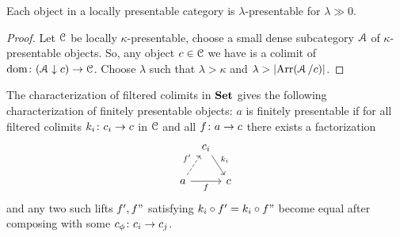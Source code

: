 \documentclass[a4paper,11pt,oneside,openany]{scrbook}
\begin{document}
\begin{prop}
   Each object in a locally presentable category is $ \lambda $-presentable
   for $ \lambda \gg 0 $.
\end{prop}
\begin{proof}
    Let $ \operatorname{\mathcal{C}} $ be locally $\kappa $-presentable, choose a small dense subcategory $\operatorname{\mathcal{A}} $ of $ \kappa $-presentable objects.
    So, any object $ c \in \operatorname{\mathcal{C}} $ we have is a colimit of $\operatorname{dom}\colon (\operatorname{\mathcal{A}}\downarrow c)\rightarrow\operatorname{\mathcal{C}}$.
    Choose $ \lambda $ such that $ \lambda > \kappa $ and $ \lambda > \left\lvert \operatorname{Arr}(\operatorname{\mathcal{A}}/c) \right\rvert $.
\end{proof}
The characterization of filtered colimits in $ {\normalfont\textbf{Set}} $ gives the following characterization of finitely presentable objects:
$ a $ is finitely presentable if for all filtered colimits $ k_i \colon c_i \to c $ in $ \operatorname{\mathcal{C}} $ and all $ f\colon a \to c $ there exists a factorization
\begin{displaymath}
    \begin{tikzcd}[column sep=tiny]
	& c_i \arrow[dr, "k_i"]&\\
	a \arrow[ur, dashed, "f'"]\arrow[rr, "f"']&& c
    \end{tikzcd}
\end{displaymath}
and any two such lifts $ f', f"  $ satisfying $ k_i \circ f' = k_i \circ f" $ become equal after composing with some $ c_\phi \colon c_i \to c_j $.
\end{document}

